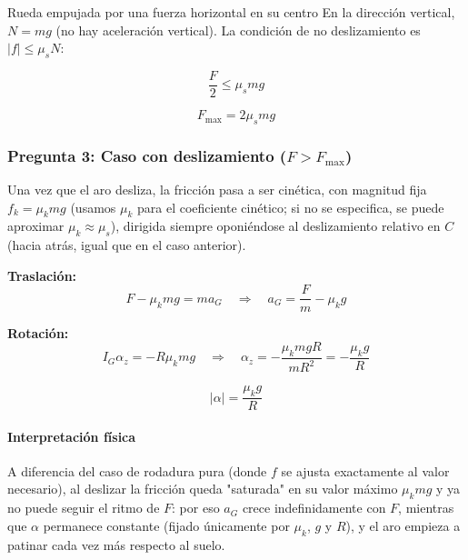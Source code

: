 \begin{solucion}{Rueda empujada por una fuerza horizontal en su centro}
En la dirección vertical, $N = mg$ (no hay aceleración vertical). La condición de no deslizamiento es $|f| \leq \mu_s N$:

$$\frac{F}{2} \leq \mu_s mg$$

$$\boxed{F_{\text{max}} = 2\mu_s mg}$$

\subsubsection*{Pregunta 3: Caso con deslizamiento ($F > F_{\text{max}}$)}

Una vez que el aro desliza, la fricción pasa a ser cinética, con magnitud fija $f_k = \mu_k mg$ (usamos $\mu_k$ para el coeficiente cinético; si no se especifica, se puede aproximar $\mu_k \approx \mu_s$), dirigida siempre oponiéndose al deslizamiento relativo en $C$ (hacia atrás, igual que en el caso anterior).

\textbf{Traslación:}
$$F - \mu_k mg = ma_G \quad\Rightarrow\quad \boxed{a_G = \frac{F}{m} - \mu_k g}$$

\textbf{Rotación:}
$$I_G\alpha_z = -R\mu_k mg \quad\Rightarrow\quad \alpha_z = -\frac{\mu_k mgR}{mR^2} = -\frac{\mu_k g}{R}$$

$$\boxed{|\alpha| = \frac{\mu_k g}{R}}$$

\paragraph{Interpretación física} A diferencia del caso de rodadura pura (donde $f$ se ajusta exactamente al valor necesario), al deslizar la fricción queda "saturada" en su valor máximo $\mu_k mg$ y ya no puede seguir el ritmo de $F$: por eso $a_G$ crece indefinidamente con $F$, mientras que $\alpha$ permanece constante (fijado únicamente por $\mu_k$, $g$ y $R$), y el aro empieza a patinar cada vez más respecto al suelo.
\end{solucion}
